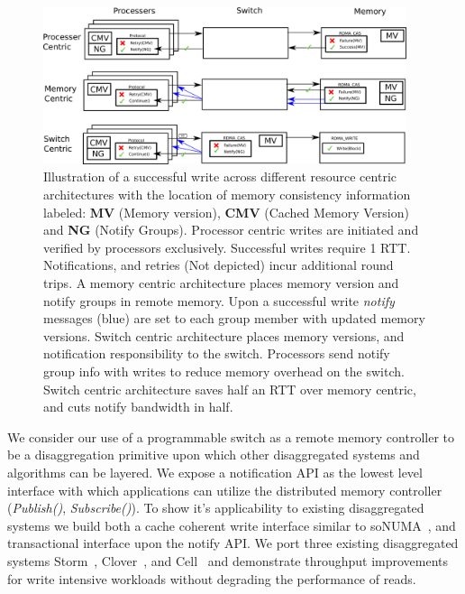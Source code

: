 \begin{figure}
      \centering
      \includegraphics[width=0.95\textwidth]{fig/notify.png}
      \caption{Illustration of a successful write across different
      resource centric architectures with the location of memory
      consistency information labeled: \textbf{MV} (Memory version),
      \textbf{CMV} (Cached Memory Version) and \textbf{NG} (Notify
      Groups). Processor centric writes are
      initiated and verified by processors exclusively. Successful
      writes require 1 RTT. Notifications, and retries (Not depicted)
    incur additional round trips. A memory centric architecture places
    memory version and notify groups in remote memory. Upon a
    successful write \textit{notify} messages (blue) are set to each
    group member with updated memory versions. Switch centric
    architecture places memory versions, and notification
    responsibility to the switch. Processors send notify group info
    with writes to reduce memory overhead on the switch. Switch
    centric architecture saves half an RTT over memory centric, and
    cuts notify bandwidth in half.
      \label{fig:notify}
    }
\end{figure}


We consider our use of a programmable switch as a remote memory
controller to be a disaggregation primitive upon which other
disaggregated systems and algorithms can be layered. We expose a
notification API as the lowest level interface with which applications
can utilize the distributed memory controller (\textit{Publish()},
\textit{Subscribe()}). To show it's applicability to existing
disaggregated systems we build both a cache coherent write interface
similar to soNUMA~\cite{sonuma}, and transactional interface upon the
notify API. We port three existing disaggregated systems
Storm~\cite{storm}, Clover~\cite{clover}, and Cell~\cite{cell} and
demonstrate throughput improvements for write intensive workloads
without degrading the performance of reads.

